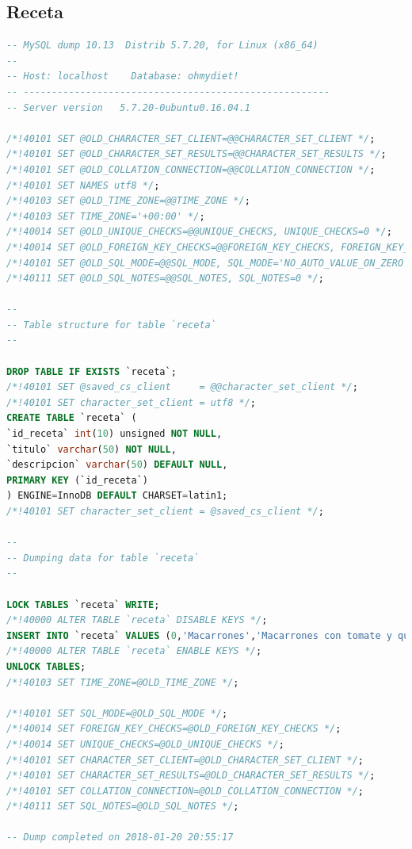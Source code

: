 \documentclass[12pt,letterpaper]{article}
\begin{document}
\subsection{Receta}
\begin{lstlisting}[language=sql]
-- MySQL dump 10.13  Distrib 5.7.20, for Linux (x86_64)
--
-- Host: localhost    Database: ohmydiet!
-- ------------------------------------------------------
-- Server version	5.7.20-0ubuntu0.16.04.1

/*!40101 SET @OLD_CHARACTER_SET_CLIENT=@@CHARACTER_SET_CLIENT */;
/*!40101 SET @OLD_CHARACTER_SET_RESULTS=@@CHARACTER_SET_RESULTS */;
/*!40101 SET @OLD_COLLATION_CONNECTION=@@COLLATION_CONNECTION */;
/*!40101 SET NAMES utf8 */;
/*!40103 SET @OLD_TIME_ZONE=@@TIME_ZONE */;
/*!40103 SET TIME_ZONE='+00:00' */;
/*!40014 SET @OLD_UNIQUE_CHECKS=@@UNIQUE_CHECKS, UNIQUE_CHECKS=0 */;
/*!40014 SET @OLD_FOREIGN_KEY_CHECKS=@@FOREIGN_KEY_CHECKS, FOREIGN_KEY_CHECKS=0 */;
/*!40101 SET @OLD_SQL_MODE=@@SQL_MODE, SQL_MODE='NO_AUTO_VALUE_ON_ZERO' */;
/*!40111 SET @OLD_SQL_NOTES=@@SQL_NOTES, SQL_NOTES=0 */;

--
-- Table structure for table `receta`
--

DROP TABLE IF EXISTS `receta`;
/*!40101 SET @saved_cs_client     = @@character_set_client */;
/*!40101 SET character_set_client = utf8 */;
CREATE TABLE `receta` (
`id_receta` int(10) unsigned NOT NULL,
`titulo` varchar(50) NOT NULL,
`descripcion` varchar(50) DEFAULT NULL,
PRIMARY KEY (`id_receta`)
) ENGINE=InnoDB DEFAULT CHARSET=latin1;
/*!40101 SET character_set_client = @saved_cs_client */;

--
-- Dumping data for table `receta`
--

LOCK TABLES `receta` WRITE;
/*!40000 ALTER TABLE `receta` DISABLE KEYS */;
INSERT INTO `receta` VALUES (0,'Macarrones','Macarrones con tomate y queso rayado'),(1,'Pollo y verdura','Filetes de pollo con menestra de verduras'),(2,'Ensalada mixta','Tomate, lechuga, atun.'),(3,'Ternera y habas','Escalope de ternera con habas salteadas'),(4,'Pescado al limon','Pescado, limon, sal, ajo y aceite'),(5,'Bistec','Cebolla, bistec, oregano, aceite'),(6,'Paella','Arroz, calamares, pollo, mejillones, gambas');
/*!40000 ALTER TABLE `receta` ENABLE KEYS */;
UNLOCK TABLES;
/*!40103 SET TIME_ZONE=@OLD_TIME_ZONE */;

/*!40101 SET SQL_MODE=@OLD_SQL_MODE */;
/*!40014 SET FOREIGN_KEY_CHECKS=@OLD_FOREIGN_KEY_CHECKS */;
/*!40014 SET UNIQUE_CHECKS=@OLD_UNIQUE_CHECKS */;
/*!40101 SET CHARACTER_SET_CLIENT=@OLD_CHARACTER_SET_CLIENT */;
/*!40101 SET CHARACTER_SET_RESULTS=@OLD_CHARACTER_SET_RESULTS */;
/*!40101 SET COLLATION_CONNECTION=@OLD_COLLATION_CONNECTION */;
/*!40111 SET SQL_NOTES=@OLD_SQL_NOTES */;

-- Dump completed on 2018-01-20 20:55:17

\end{lstlisting}
\end{document}
